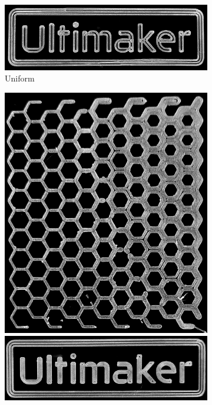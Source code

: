 {\begin{figure}
\begin{subfigure}{\figwidth}
\includegraphics[width=\figwidth]{sources-applications-P3-print-UM-naive-edited.png}
\caption{Uniform}\label{print_naive}
\end{subfigure}
\begin{subfigure}{\figwidth}\centering
\includegraphics[height=\figheight]{sources-applications-P3-print-hex-center-edited.png}
\includegraphics[width=\figwidth]{sources-applications-P3-print-UM-center-edited.png}

\end{subfigure}
\end{figure}}
